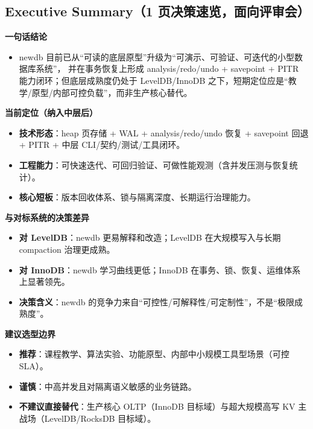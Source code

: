 \subsection{Executive Summary（1 页决策速览，面向评审会）}

\textbf{一句话结论}
\begin{itemize}
  \item newdb 目前已从“可读的底层原型”升级为“可演示、可验证、可迭代的小型数据库系统”，
  并在事务恢复上形成 analysis/redo/undo + savepoint + PITR 能力闭环；但底层成熟度仍处于 LevelDB/InnoDB 之下，短期定位应是“教学/原型/内部可控负载”，而非生产核心替代。
\end{itemize}

\textbf{当前定位（纳入中层后）}
\begin{itemize}
  \item \textbf{技术形态}：heap 页存储 + WAL + analysis/redo/undo 恢复 + savepoint 回退 + PITR + 中层 CLI/契约/测试/工具闭环。
  \item \textbf{工程能力}：可快速迭代、可回归验证、可做性能观测（含并发压测与恢复统计）。
  \item \textbf{核心短板}：版本回收体系、锁与隔离深度、长期运行治理能力。
\end{itemize}

\textbf{与对标系统的决策差异}
\begin{itemize}
  \item \textbf{对 LevelDB}：newdb 更易解释和改造；LevelDB 在大规模写入与长期 compaction 治理更成熟。
  \item \textbf{对 InnoDB}：newdb 学习曲线更低；InnoDB 在事务、锁、恢复、运维体系上显著领先。
  \item \textbf{决策含义}：newdb 的竞争力来自“可控性/可解释性/可定制性”，不是“极限成熟度”。
\end{itemize}

\textbf{建议选型边界}
\begin{itemize}
  \item \textbf{推荐}：课程教学、算法实验、功能原型、内部中小规模工具型场景（可控 SLA）。
  \item \textbf{谨慎}：中高并发且对隔离语义敏感的业务链路。
  \item \textbf{不建议直接替代}：生产核心 OLTP（InnoDB 目标域）与超大规模高写 KV 主战场（LevelDB/RocksDB 目标域）。
\end{itemize}

